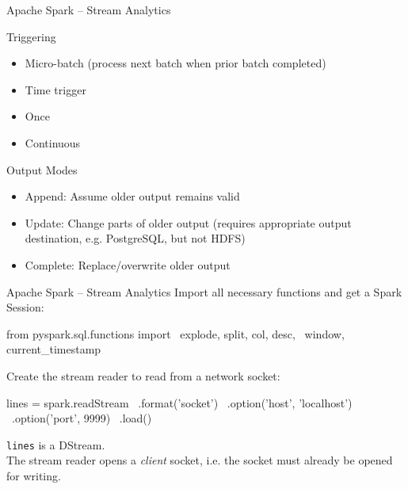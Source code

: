 \documentclass[ignorenonframetext,xcolor=x11names]{beamer}
\begin{document}
\begin{frame}[label=advanced]{Apache Spark -- Stream Analytics}
\begin{block}{Triggering}
\begin{itemize}
   \item Micro-batch (process next batch when prior batch completed)
   \item Time trigger
   \item Once
   \item Continuous
\end{itemize}
\end{block}
\begin{block}{Output Modes}
\begin{itemize}
   \item Append: Assume older output remains valid
   \item Update: Change parts of older output (requires appropriate output destination, e.g. PostgreSQL, but not HDFS)
   \item Complete: Replace/overwrite older output
\end{itemize}
\end{block}
\end{frame}



\begin{frame}[label=withcode,fragile]{Apache Spark -- Stream Analytics}
Import all necessary functions and get a Spark Session:
\begin{pythoncode}
from pyspark.sql.functions import \
    explode, split, col, desc, \
    window, current_timestamp
\end{pythoncode}
Create the stream reader to read from a network socket:
\begin{pythoncode}
lines = spark.readStream \
             .format('socket') \
             .option('host', 'localhost') \
             .option('port', 9999) \
             .load()
\end{pythoncode}
\texttt{lines} is a DStream. \\

The stream reader opens a \emph{client} socket, i.e. the socket must already be opened for writing.
\end{frame}
\end{document}
